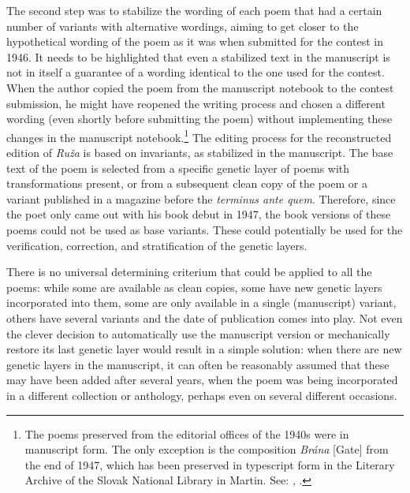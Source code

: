 \begin{paper}
\noindent The second step was to stabilize the wording of each poem that had
a certain number of variants with alternative wordings, aiming to get
closer to the hypothetical wording of the poem as it was when submitted
for the contest in 1946. It needs to be highlighted that even
a stabilized text in the manuscript is not in itself a guarantee of
a wording identical to the one used for the contest. When the author
copied the poem from the manuscript notebook to the contest submission,
he might have reopened the writing process and chosen a different
wording (even shortly before submitting the poem) without implementing
these changes in the manuscript notebook.\footnote{The poems preserved
  from the editorial offices of the 1940s were in manuscript form. The
  only exception is the composition \emph{Brána} [Gate] from the end of
  1947, which has been preserved in typescript form in the Literary
  Archive of the Slovak National Library in Martin. See: \cite{mihalik_brana_nodate}, .} The editing process for the reconstructed
edition of \emph{Ruža} is based on invariants, as stabilized in the
manuscript. The base text of the poem is selected from a specific
genetic layer of poems with transformations present, or from
a subsequent clean copy of the poem or a variant published in a magazine
before the \emph{terminus ante quem}. Therefore, since the poet only
came out with his book debut in 1947, the book versions of these poems could
not be used as base variants. These could potentially be used for the
verification, correction, and stratification of the genetic layers.

There is no universal determining criterium that could be applied to all
the poems: while some are available as clean copies, some have new
genetic layers incorporated into them, some are only available in
a single (manuscript) variant, others have several variants and the date
of publication comes into play. Not even the clever decision to
automatically use the manuscript version or mechanically restore its
last genetic layer would result in a simple solution: when there are new
genetic layers in the manuscript, it can often be reasonably assumed
that these may have been added after several years, when the poem was
being incorporated in a different collection or anthology, perhaps even
on several different occasions.


\end{paper}
